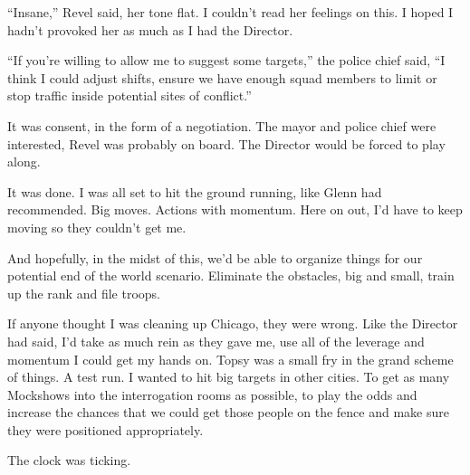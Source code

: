 ``Insane,'' Revel said, her tone flat.  I couldn't read her feelings on this.  I hoped I hadn't provoked her as much as I had the Director.



``If you're willing to allow me to suggest some targets,'' the police chief said, ``I think I could adjust shifts, ensure we have enough squad members to limit or stop traffic inside potential sites of conflict.''



It was consent, in the form of a negotiation.  The mayor and police chief were interested, Revel was probably on board.  The Director would be forced to play along.



It was done.  I was all set to hit the ground running, like Glenn had recommended.  Big moves.  Actions with momentum.  Here on out, I'd have to keep moving so they couldn't get me.



And hopefully, in the midst of this, we'd be able to organize things for our potential end of the world scenario.  Eliminate the obstacles, big and small, train up the rank and file troops.



If anyone thought I was cleaning up Chicago, they were wrong.  Like the Director had said, I'd take as much rein as they gave me, use all of the leverage and momentum I could get my hands on.  Topsy was a small fry in the grand scheme of things.  A test run.  I wanted to hit big targets in other cities.  To get as many Mockshows into the interrogation rooms as possible, to play the odds and increase the chances that we could get those people on the fence and make sure they were positioned appropriately.



The clock was ticking.





